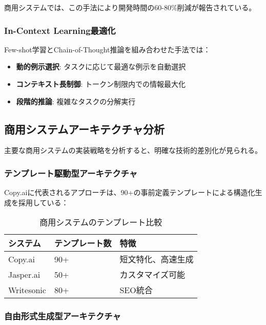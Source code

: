\documentclass[11pt, a4paper]{article}
\begin{document}
商用システムでは、この手法により開発時間の60-80\%削減が報告されている。

\subsubsection{In-Context Learning最適化}

Few-shot学習とChain-of-Thought推論を組み合わせた手法では：

\begin{itemize}[noitemsep,topsep=0pt]
    \item \textbf{動的例示選択}: タスクに応じて最適な例示を自動選択
    \item \textbf{コンテキスト長制御}: トークン制限内での情報最大化
    \item \textbf{段階的推論}: 複雑なタスクの分解実行
\end{itemize}

\subsection{商用システムアーキテクチャ分析}

主要な商用システムの実装戦略を分析すると、明確な技術的差別化が見られる。

\subsubsection{テンプレート駆動型アーキテクチャ}

Copy.aiに代表されるアプローチは、90+の事前定義テンプレートによる構造化生成を採用している：

\begin{table}[h]
\centering
\begin{tabular}{|l|l|l|}
\hline
\textbf{システム} & \textbf{テンプレート数} & \textbf{特徴} \\
\hline
Copy.ai & 90+ & 短文特化、高速生成 \\
\hline
Jasper.ai & 50+ & カスタマイズ可能 \\
\hline
Writesonic & 80+ & SEO統合 \\
\hline
\end{tabular}
\caption{商用システムのテンプレート比較}
\end{table}

\subsubsection{自由形式生成型アーキテクチャ}
\end{document}
